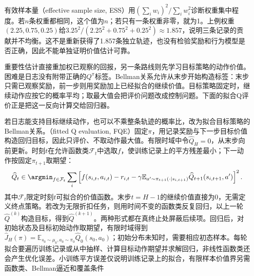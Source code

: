 有效样本量（effective sample size, ESS）用$(\sum_iw_i)^2/\sum_iw_i^2$诊断权重集中程度。若$n$条权重都相同，这个值为$n$；若只有一条权重非零，就为1。上例权重$(2.25,0.75,0.25)$给$3.25^2/(2.25^2+0.75^2+0.25^2)\approx1.857$，说明三条记录的贡献并不均衡。这不是重新获得了1.857条独立轨迹，也没有检验奖励和行为模型是否正确，因此不能单独证明价值估计可靠。

重要性估计直接重加权已观察的回报，另一条路线则先学习目标策略的动作价值。困难是日志没有附带正确的$Q^\pi$标签。Bellman关系允许从末步开始构造标签：末步只需已观察奖励，前一步则用奖励加上已经拟合的继续价值。目标策略固定时，继续动作应按它的概率平均；取最大值会把评价问题改成控制问题。下面的拟合Q评价正是把这一反向计算交给回归器。

若日志能支持目标继续动作，也可以不乘整条轨迹的概率比，改为拟合目标策略的Bellman关系。（fitted Q evaluation, FQE）固定$\pi$，用记录奖励与下一步目标价值构造回归目标，因此只评价、不取动作最大值。有限时域中令$\widehat Q_H=0$，从末步向前更新。时刻$t$在允许函数类$\mathcal F_t$中选取$f$，使训练记录上的平方残差最小；下一动作按固定$\pi_{t+1}$取期望：
\begin{equation}
  \label{eq:rl-information-fqe}
  \widehat Q_t
  \in\argmin_{f\in\mathcal F_t}
    \sum_{i}
    \left[
      f(s_{i,t},a_{i,t})
      -r_{i,t}
      -\gamma\mathbb E_{a'\sim\pi_{t+1}(\cdot\mid s_{i,t+1})}
                       \widehat Q_{t+1}(s_{i,t+1},a')
    \right]^2.
\end{equation}
其中$\mathcal F_t$限定时刻$t$可拟合的价值函数。末步$t=H-1$的继续价值直接为0，无需定义终点策略。若改为无限折扣任务，则用时间不变的函数类反复回归，以上一轮$\widehat Q^{(k)}$构造目标，得到$\widehat Q^{(k+1)}$。两种形式都在真终止处屏蔽后续项。回归后，对初始状态及目标初始动作取期望，有限时域得到$\widehat J_H(\pi)=\mathbb E_{s_0\sim\mu_0,a_0\sim\pi_0}\widehat Q_0(s_0,a_0)$；初始分布未知时，需要相应初态样本。每轮拟合要遍历训练记录或从中抽样、计算目标动作期望并求解回归，非线性函数类还会产生优化误差。小训练平方误差仅说明训练记录上的拟合，有限样本价值界另需函数类、Bellman逼近和覆盖条件

